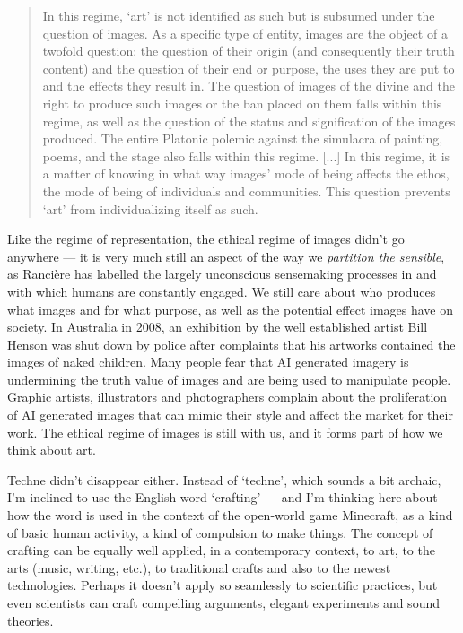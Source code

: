 \documentclass[letterpaper]{article}
\begin{document}
    \begin{quote}
        In this regime, ‘art’ is not identified as such but is subsumed under the question of images. As a specific type of entity, images are the object of a twofold question: the question of their origin (and consequently their truth content) and the question of their end or purpose, the uses they are put to and the effects they result in. The question of images of the divine and the right to produce such images or the ban placed on them falls within this regime, as well as the question of the status and signification of the images produced. The entire Platonic polemic against the simulacra of painting, poems, and the stage also falls within this regime. [...] In this regime, it is a matter of knowing in what way images' mode of being affects the ethos, the mode of being of individuals and communities. This question prevents ‘art’ from individualizing itself as such. \citep[pp.20-21]{RancierPltcsOfThAsthtcs2004}
    \end{quote}

    Like the regime of representation, the ethical regime of images didn't go anywhere — it is very much still an aspect of the way we \emph{partition the sensible}, as Rancière has labelled the largely unconscious sensemaking processes in and with which humans are constantly engaged. We still care about who produces what images and for what purpose, as well as the potential effect images have on society. In Australia in 2008, an exhibition by the well established artist Bill Henson was shut down by police after complaints that his artworks contained the images of naked children. Many people fear that AI generated imagery is undermining the truth value of images and are being used to manipulate people. Graphic artists, illustrators and photographers complain about the proliferation of AI generated images that can mimic their style and affect the market for their work. The ethical regime of images is still with us, and it forms part of how we think about art. 

    Techne didn't disappear either. Instead of ‘techne’, which sounds a bit archaic, I'm inclined to use the English word ‘crafting’ — and I'm thinking here about how the word is used in the context of the open-world game Minecraft, as a kind of basic human activity, a kind of compulsion to make things. The concept of crafting can be equally well applied, in a contemporary context, to art, to the arts (music, writing, etc.), to traditional crafts and also to the newest technologies. Perhaps it doesn't apply so seamlessly to scientific practices, but even scientists can craft compelling arguments, elegant experiments and sound theories.
\end{document}
